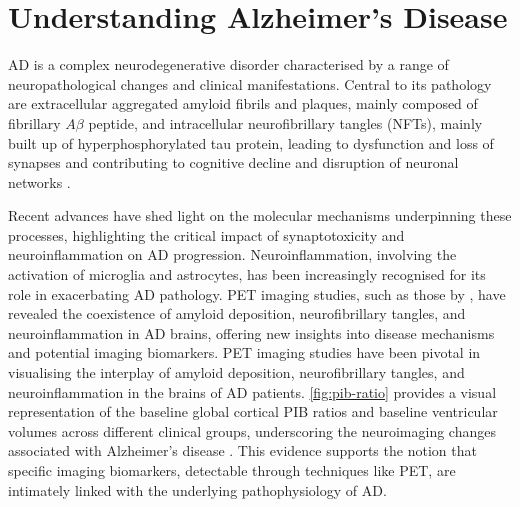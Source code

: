 \documentclass[10pt]{article}
\begin{document}
\begin{sloppypar}
  \section{Understanding Alzheimer’s Disease}
  \label{sec:alzheimers-disease}

  AD is a complex neurodegenerative disorder characterised by a range of neuropathological changes and clinical manifestations. Central to its pathology are extracellular aggregated amyloid fibrils and plaques, mainly composed of fibrillary $A\beta$ peptide, and intracellular neurofibrillary tangles (NFTs), mainly built up of hyperphosphorylated tau protein, leading to dysfunction and loss of synapses and contributing to cognitive decline and disruption of neuronal networks \citep{heneka_neuroinflammation_2015,cai_magnetic_2020}.

  Recent advances have shed light on the molecular mechanisms underpinning these processes, highlighting the critical impact of synaptotoxicity and neuroinflammation on AD progression. Neuroinflammation, involving the activation of microglia and astrocytes, has been increasingly recognised for its role in exacerbating AD pathology. PET imaging studies, such as those by \cite{zhou_pet_2021}, have revealed the coexistence of amyloid deposition, neurofibrillary tangles, and neuroinflammation in AD brains, offering new insights into disease mechanisms and potential imaging biomarkers. PET imaging studies have been pivotal in visualising the interplay of amyloid deposition, neurofibrillary tangles, and neuroinflammation in the brains of AD patients. \autoref{fig:pib-ratio} provides a visual representation of the baseline global cortical PIB ratios and baseline ventricular volumes across different clinical groups, underscoring the neuroimaging changes associated with Alzheimer’s disease \citep{jack_serial_2009}. This evidence supports the notion that specific imaging biomarkers, detectable through techniques like PET, are intimately linked with the underlying pathophysiology of AD.


\end{sloppypar}
\end{document}
